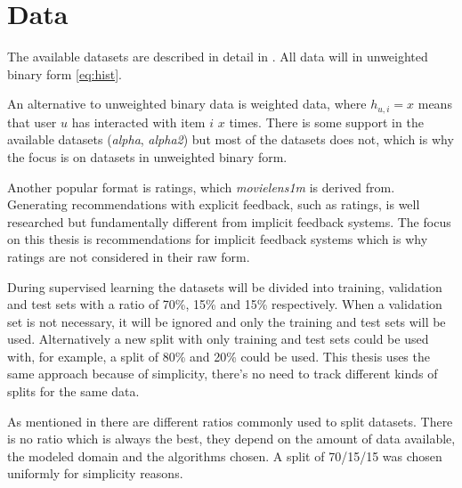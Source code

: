 
\section{Data}

The available datasets are described in detail in . All data will in unweighted binary form \eqref{eq:hist}.

An alternative to unweighted binary data is weighted data, where $h_{u, i} = x$ means that user $u$ has interacted with item $i$ $x$ times. There is some support in the available datasets (\textit{alpha}, \textit{alpha2}) but most of the datasets does not, which is why the focus is on datasets in unweighted binary form.

Another popular format is ratings, which \textit{movielens1m} is derived from. Generating recommendations with explicit feedback, such as ratings, is well researched but fundamentally different from implicit feedback systems. The focus on this thesis is recommendations for implicit feedback systems which is why ratings are not considered in their raw form.

During supervised learning the datasets will be divided into training, validation and test sets with a ratio of 70\%, 15\% and 15\% respectively. When a validation set is not necessary, it will be ignored and only the training and test sets will be used. Alternatively a new split with only training and test sets could be used with, for example, a split of 80\% and 20\% could be used. This thesis uses the same approach because of simplicity, there's no need to track different kinds of splits for the same data.

As mentioned in  there are different ratios commonly used to split datasets. There is no ratio which is always the best, they depend on the amount of data available, the modeled domain and the algorithms chosen. A split of 70/15/15 was chosen uniformly for simplicity reasons.


